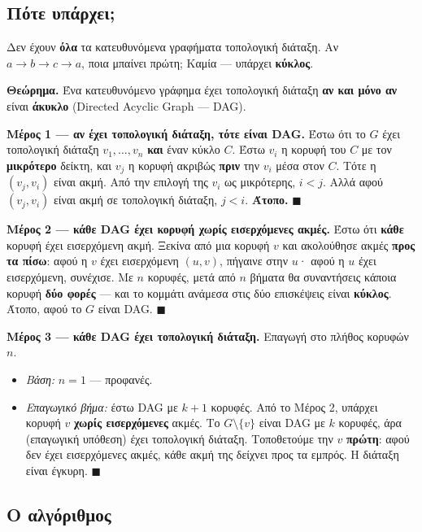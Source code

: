 \documentclass[11pt,a4paper]{article}
\begin{document}
\subsection{Πότε υπάρχει;}

Δεν έχουν \textbf{όλα} τα κατευθυνόμενα γραφήματα τοπολογική διάταξη. Αν
$a \to b \to c \to a$, ποια μπαίνει πρώτη; Καμία --- υπάρχει \textbf{κύκλος}.

\begin{keypoint}
\textbf{Θεώρημα.} Ένα κατευθυνόμενο γράφημα έχει τοπολογική διάταξη \textbf{αν
και μόνο αν} είναι \textbf{άκυκλο} (Directed Acyclic Graph --- DAG).
\end{keypoint}

\textbf{Μέρος 1 --- αν έχει τοπολογική διάταξη, τότε είναι DAG.} Έστω ότι το $G$
έχει τοπολογική διάταξη $v_1, \dots, v_n$ \textbf{και} έναν κύκλο $C$. Έστω
$v_i$ η κορυφή του $C$ με τον \textbf{μικρότερο} δείκτη, και $v_j$ η κορυφή
ακριβώς \textbf{πριν} την $v_i$ μέσα στον $C$. Τότε η $(v_j, v_i)$ είναι ακμή.
Από την επιλογή της $v_i$ ως μικρότερης, $i < j$. Αλλά αφού $(v_j, v_i)$ είναι
ακμή σε τοπολογική διάταξη, $j < i$. \textbf{Άτοπο.} $\blacksquare$

\textbf{Μέρος 2 --- κάθε DAG έχει κορυφή χωρίς εισερχόμενες ακμές.} Έστω ότι
\textbf{κάθε} κορυφή έχει εισερχόμενη ακμή. Ξεκίνα από μια κορυφή $v$ και
ακολούθησε ακμές \textbf{προς τα πίσω}: αφού η $v$ έχει εισερχόμενη $(u, v)$,
πήγαινε στην $u$· αφού η $u$ έχει εισερχόμενη, συνέχισε. Με $n$ κορυφές, μετά από
$n$ βήματα θα συναντήσεις κάποια κορυφή \textbf{δύο φορές} --- και το κομμάτι
ανάμεσα στις δύο επισκέψεις είναι \textbf{κύκλος}. Άτοπο, αφού το $G$ είναι DAG.
$\blacksquare$

\textbf{Μέρος 3 --- κάθε DAG έχει τοπολογική διάταξη.} Επαγωγή στο πλήθος
κορυφών $n$.
\begin{itemize}
  \item \textit{Βάση:} $n = 1$ --- προφανές.
  \item \textit{Επαγωγικό βήμα:} έστω DAG με $k+1$ κορυφές. Από το Μέρος 2,
  υπάρχει κορυφή $v$ \textbf{χωρίς εισερχόμενες} ακμές. Το $G \setminus \{v\}$
  είναι DAG με $k$ κορυφές, άρα (επαγωγική υπόθεση) έχει τοπολογική διάταξη.
  Τοποθετούμε την $v$ \textbf{πρώτη}: αφού δεν έχει εισερχόμενες ακμές, κάθε ακμή
  της δείχνει προς τα εμπρός. Η διάταξη είναι έγκυρη. $\blacksquare$
\end{itemize}

\subsection{Ο αλγόριθμος}
\end{document}
